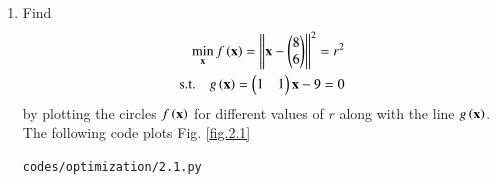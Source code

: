 \renewcommand{\theequation}{\theenumi}
\begin{enumerate}[label=\arabic*.,ref=\thesubsection.\theenumi]

\item
	\label{convex_code}
Find
\begin{align}
\label{eq2_1_circ}
	\min_{\mathbf{x}}f\left(\mathbf{x}\right) = \left\lVert\mathbf{x}-\begin{pmatrix}8\\6\end{pmatrix}\right\rVert^2 = r^2 \\
\text{s.t.} \quad 	g\left(\mathbf{x}\right) = \begin{pmatrix}1 & 1\end{pmatrix}\mathbf{x} - 9 = 0\label{eq2_1_line}
\end{align}
by plotting the circles $f\left(\mathbf{x}\right)$
%
%
for different values of $r$ along with the line $g\left(\mathbf{x}\right)$.
%
%
\\
\solution 
The following code plots Fig. \ref{fig.2.1}	

%	
\begin{lstlisting}
codes/optimization/2.1.py
\end{lstlisting}


\end{enumerate}
